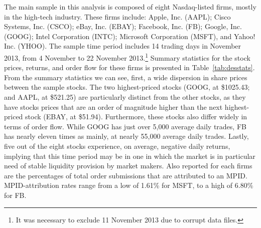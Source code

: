 \documentclass{article}
\begin{document}
\noindent The main sample in this analysis is composed of eight Nasdaq-listed firms, mostly in the high-tech industry. These firms include: Apple, Inc. (AAPL); Cisco Systems, Inc. (CSCO); eBay, Inc. (EBAY); Facebook, Inc. (FB); Google, Inc. (GOOG); Intel Corporation (INTC); Microsoft Corporation (MSFT), and Yahoo! Inc. (YHOO). The sample time period includes 14 trading days in November 2013, from 4 November to 22 November 2013.\footnote{It was necessary to exclude 11 November 2013 due to corrupt data files.} Summary statistics for the stock prices, returns, and order flow for these firms is presented in Table~\ref{tab:desstats}. From the summary statistics we can see, first, a wide dispersion in share prices between the sample stocks. The two highest-priced stocks (GOOG, at \$1025.43; and AAPL, at \$521.25) are particularly distinct from the other stocks, as they have stocks prices that are an order of magnitude higher than the next highest-priced stock (EBAY, at \$51.94). Furthermore, these stocks also differ widely in terms of order flow. While GOOG has just over 5,000 average daily trades, FB has nearly eleven times as mainly, at nearly 55,000 average daily trades. Lastly, five out of the eight stocks experience, on average, negative daily returns, implying that this time period may be in one in which the market is in particular need of stable liquidity provision by market makers. Also reported for each firms are the percentages of total order submissions that are attributed to an MPID. MPID-attribution rates range from a low of 1.61\% for MSFT, to a high of $6.80\%$ for FB.
\end{document}
